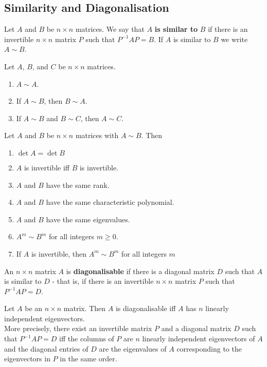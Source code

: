 \documentclass{article}
\begin{document}
\subsection{Similarity and Diagonalisation}
\begin{definition}
    Let $A$ and $B$ be $n\times n$ matrices. We say that $A$ \textbf{is similar to} $B$ if there is an invertible $n\times n$ matrix $P$ such that $P^{-1}AP=B$. If $A$ is similar to $B$ we write $A\sim B$.
\end{definition}
\begin{theorem}
    Let $A$, $B$, and $C$ be $n\times n$ matrices.
    \begin{enumerate}
        \item $A\sim A$.
        \item If $A\sim B$, then $B\sim A$.
        \item If $A\sim B$ and $B\sim C$, then $A\sim C$.
    \end{enumerate}
\end{theorem}
\begin{theorem}
    Let $A$ and $B$ be $n\times n$ matrices with $A\sim B$. Then
    \begin{enumerate}
        \item $\det A = \det B$
        \item $A$ is invertible iff $B$ is invertible.
        \item $A$ and $B$ have the same rank.
        \item $A$ and $B$ have the same characteristic polynomial.
        \item $A$ and $B$ have the same eigenvalues.
        \item $A^m\sim B^m$ for all integers $m\geq 0$.
        \item If $A$ is invertible, then $A^m\sim B^m$ for all integers $m$
    \end{enumerate}
\end{theorem}
\begin{definition}
    An $n\times n$ matrix $A$ is \textbf{diagonalisable} if there is a diagonal matrix $D$ such that $A$ is similar to $D$ - that is, if there is an invertible $n\times n$ matrix $P$ such that $P^{-1}AP = D$.
\end{definition}
\begin{theorem}
    Let $A$ be an $n\times n$ matrix. Then $A$ is diagonalisable iff $A$ has $n$ linearly independent eigenvectors.\\
    More precisely, there exist an invertible matrix $P$ and a diagonal matrix $D$ such that $P^{-1}AP=D$ iff the columns of $P$ are $n$ linearly independent eigenvectors of $A$ and the diagonal entries of $D$ are the eigenvalues of $A$ corresponding to the eigenvectors in $P$ in the same order.
\end{theorem}
\end{document}
